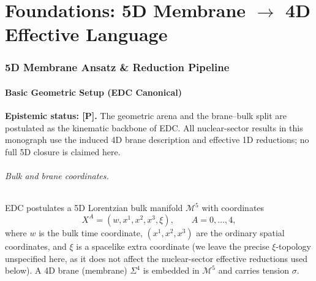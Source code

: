\documentclass[11pt,a4paper]{article}
\begin{document}
\newpage
\tableofcontents
\newpage


\part{Foundations: 5D Membrane $\to$ 4D Effective Language}

\section{5D Membrane Ansatz \& Reduction Pipeline}
\label{sec:5D_ansatz}

\subsection{Basic Geometric Setup (EDC Canonical)}
\label{sec:geometric_setup}

\begin{statusbox}
\textbf{Epistemic status: [P].} The geometric arena and the brane--bulk split are postulated as the kinematic backbone of EDC. All nuclear-sector results in this monograph use the induced 4D brane description and effective 1D reductions; no full 5D closure is claimed here.
\end{statusbox}

\paragraph{Bulk and brane coordinates.}
EDC postulates a 5D Lorentzian bulk manifold $\mathcal{M}^5$ with coordinates
\[
X^{A} = (w, x^{1}, x^{2}, x^{3}, \xi), \qquad A=0,\dots,4,
\]
where $w$ is the bulk time coordinate, $(x^{1},x^{2},x^{3})$ are the ordinary spatial coordinates, and $\xi$ is a spacelike extra coordinate (we leave the precise $\xi$-topology unspecified here, as it does not affect the nuclear-sector effective reductions used below).
A 4D brane (membrane) $\Sigma^4$ is embedded in $\mathcal{M}^5$ and carries tension $\sigma$.
\end{document}
